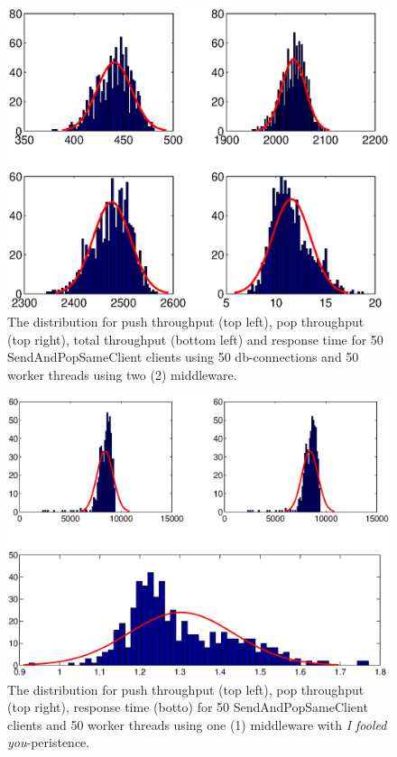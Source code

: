 \documentclass{article}
\begin{document}
        \begin{figure}[hbtp]
        \centering
        \centerline{\includegraphics[scale=0.5]{img/histfit_10middleware_push_rop_total_resptime.eps}}
        \caption{The distribution for push throughput (top left), pop throughput (top right), total throughput (bottom left) and response time for 50 SendAndPopSameClient clients using 50 db-connections and 50 worker threads using two (2) middleware.}
        \end{figure}
        
        
        \begin{figure}[hbtp]
        \centering
        \centerline{\includegraphics[scale=0.5]{img/histfit_i_fooled_you_50_thrds}}
        \caption{The distribution for push throughput (top left), pop throughput (top right), response time (botto) for 50 SendAndPopSameClient clients and 50 worker threads using one (1) middleware with \textit{I fooled you}-peristence.}
        \end{figure}
        
\end{document}
